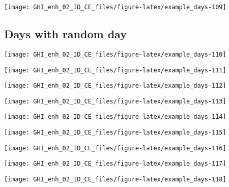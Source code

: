 \documentclass[
  10pt,
  a4paper,oneside]{article}
\begin{document}
\begin{center}\texttt{[image: GHI\_enh\_02\_ID\_CE\_files/figure-latex/example\_days-109]} \end{center}

\FloatBarrier

\hypertarget{days-with-random-day}{%
\subsection{Days with random day}\label{days-with-random-day}}

\begin{center}\texttt{[image: GHI\_enh\_02\_ID\_CE\_files/figure-latex/example\_days-110]} \end{center}

\begin{center}\texttt{[image: GHI\_enh\_02\_ID\_CE\_files/figure-latex/example\_days-111]} \end{center}

\begin{center}\texttt{[image: GHI\_enh\_02\_ID\_CE\_files/figure-latex/example\_days-112]} \end{center}

\begin{center}\texttt{[image: GHI\_enh\_02\_ID\_CE\_files/figure-latex/example\_days-113]} \end{center}

\begin{center}\texttt{[image: GHI\_enh\_02\_ID\_CE\_files/figure-latex/example\_days-114]} \end{center}

\begin{center}\texttt{[image: GHI\_enh\_02\_ID\_CE\_files/figure-latex/example\_days-115]} \end{center}

\begin{center}\texttt{[image: GHI\_enh\_02\_ID\_CE\_files/figure-latex/example\_days-116]} \end{center}

\begin{center}\texttt{[image: GHI\_enh\_02\_ID\_CE\_files/figure-latex/example\_days-117]} \end{center}

\begin{center}\texttt{[image: GHI\_enh\_02\_ID\_CE\_files/figure-latex/example\_days-118]} \end{center}
\end{document}
